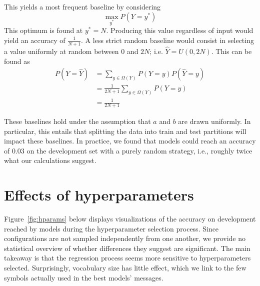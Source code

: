\documentclass[twocolumn]{article}
\begin{document}
This yields a most frequent baseline by considering
\begin{equation*}
    \max_{y^*} P(Y=y^*)
\end{equation*}
This optimum is found at $y^*=N$. 
Producing this value regardless of input would yield an accuracy of $\frac{1}{N+1}$.
%
A less strict random baseline would consist in selecting a value uniformly at random between 0 and $2N$; i.e. $\hat{Y} =  U(0, 2N)$.
This can be found as
\begin{align*}
    P(Y=\hat{Y})    &= \sum_{y \in \Omega(Y)} P(Y=y)P(\hat{Y}=y) \\
                    &= \frac{1}{2N+1} \sum_{y \in \Omega(Y)} P(Y=y) \\
                    &= \frac{1}{2N+1}
\end{align*}

These baselines hold under the assumption that $a$ and $b$ are drawn uniformly.
In particular, this entails that splitting the data into train and test partitions will impact these baselines.
In practice, we found that models could reach an accuracy of $0.03$ on the development set with a purely random strategy, i.e., roughly twice what our calculations suggest.

\section{Effects of hyperparameters}

Figure~\ref{fig:hparams} below displays visualizations of the accuracy on development reached by models during the hyperparameter selection process. 
Since configurations are not sampled independently from one another, we provide no statistical overview of whether differences they suggest are significant.
The main takeaway is that the regression process seems more sensitive to hyperparameters selected.
Surprisingly, vocabulary size has little effect, which we link to the few symbols actually used in the best models' messages.
\end{document}
